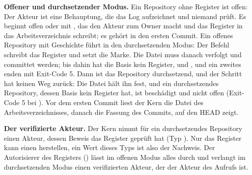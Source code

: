{\bf Offener und durchsetzender Modus.}
Ein Repository ohne Register ist offen: Der Akteur ist eine Behauptung, die das Log aufzeichnet
und niemand prüft.
Es beginnt offen oder mit , das den Akteur zum Owner macht
und das Register in das Arbeitsverzeichnis schreibt;
es gehört in den ersten Commit.
Ein offenes Repository mit Geschichte führt  in den durchsetzenden Modus:
Der Befehl schreibt das Register und setzt die Marke.
Die Datei muss danach verfolgt und committet werden;
bis dahin hat die Basis kein Register, und , 
und ein zweites  enden mit Exit-Code 5.
Dann ist das Repository durchsetzend, und der Schritt hat keinen Weg zurück:
Die Datei  hält ihn fest, und ein durchsetzendes Repository,
dessen Basis kein Register hat, ist beschädigt und nicht offen (Exit-Code 5 bei ).
Vor dem ersten Commit liest der Kern die Datei des Arbeitsverzeichnisses,
danach die Fassung des Commits, auf den HEAD zeigt.

{\bf Der verifizierte Akteur.}
Der Kern nimmt für ein durchsetzendes Repository einen Akteur, dessen Beweis das Register
geprüft hat (Typ ).
Nur das Register kann einen herstellen, ein Wert dieses Typs ist also der Nachweis.
Der Autorisierer des Registers () lässt im offenen Modus alles durch
und verlangt im durchsetzenden Modus einen verifizierten Akteur, der der Akteur des Aufrufs ist.

